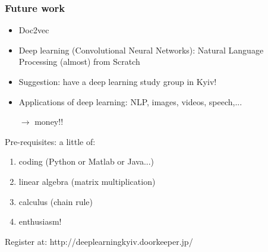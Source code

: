 \documentclass{beamer}
\begin{document}
\begin{frame}

\frametitle{Future work} 


\begin{itemize}
\item Doc2vec \cite{mikolov14}  
\item Deep learning (Convolutional Neural Networks): Natural Language Processing (almost) from Scratch \cite{collobert11}

\pause

\item Suggestion: have a deep learning study group in Kyiv!
\item Applications of deep learning: NLP, images, videos, speech,...

$\rightarrow$ money!!
\end{itemize}

\pause

Pre-requisites: a little of:

\begin{enumerate}
\item coding (Python or Matlab or Java...)
\item linear algebra (matrix multiplication)
\item calculus (chain rule)
\item enthusiasm!
\end{enumerate}

\begin{center}
Register at: http://deeplearningkyiv.doorkeeper.jp/
\end{center}

\end{frame}

\end{document}
